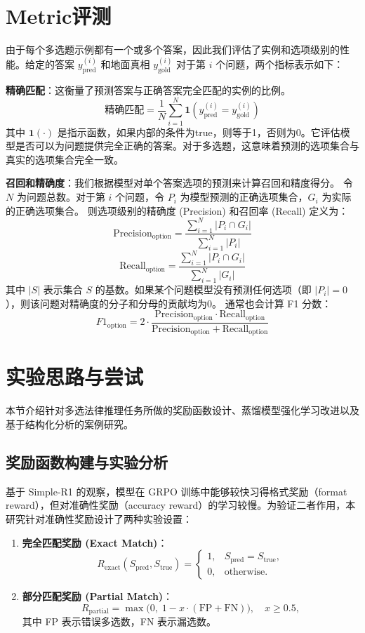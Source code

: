 \documentclass{pkuthesis}
\begin{document}
\section{Metric评测}
由于每个多选题示例都有一个或多个答案，因此我们评估了实例和选项级别的性能。给定的答案 $y^{(i)}_{\text{pred}}$ 和地面真相 $y^{(i)}_{\text{gold}}$ 对于第 $i$ 个问题，两个指标表示如下：

\textbf{精确匹配}：这衡量了预测答案与正确答案完全匹配的实例的比例。
$$ \text{精确匹配} = \frac{1}{N} \sum_{i=1}^{N} \mathbf{1}(y^{(i)}_{\text{pred}} = y^{(i)}_{\text{gold}}) $$
其中 $\mathbf{1}(\cdot)$ 是指示函数，如果内部的条件为true，则等于1，否则为0。它评估模型是否可以为问题提供完全正确的答案。对于多选题，这意味着预测的选项集合与真实的选项集合完全一致。

\textbf{召回和精确度}：我们根据模型对单个答案选项的预测来计算召回和精度得分。
令 $N$ 为问题总数。对于第 $i$ 个问题，令 $P_i$ 为模型预测的正确选项集合，$G_i$ 为实际的正确选项集合。
则选项级别的精确度 (Precision) 和召回率 (Recall) 定义为：
$$ \text{Precision}_{\text{option}} = \frac{\sum_{i=1}^N |P_i \cap G_i|}{\sum_{i=1}^N |P_i|} $$
$$ \text{Recall}_{\text{option}} = \frac{\sum_{i=1}^N |P_i \cap G_i|}{\sum_{i=1}^N |G_i|} $$
其中 $|S|$ 表示集合 $S$ 的基数。如果某个问题模型没有预测任何选项（即 $|P_i|=0$），则该问题对精确度的分子和分母的贡献均为0。
通常也会计算 F1 分数：
$$ F1_{\text{option}} = 2 \cdot \frac{\text{Precision}_{\text{option}} \cdot \text{Recall}_{\text{option}}}{\text{Precision}_{\text{option}} + \text{Recall}_{\text{option}}} $$




\section{实验思路与尝试}

本节介绍针对多选法律推理任务所做的奖励函数设计、蒸馏模型强化学习改进以及基于结构化分析的案例研究。

\subsection{奖励函数构建与实验分析}

基于 Simple-R1 的观察，模型在 GRPO 训练中能够较快习得格式奖励（format reward），但对准确性奖励（accuracy reward）的学习较慢。为验证二者作用，本研究针对准确性奖励设计了两种实验设置：

\begin{enumerate}[label=(\arabic*)]
  \item \textbf{完全匹配奖励 (Exact Match)}：
    \[
    R_{\mathrm{exact}}(S_{\mathrm{pred}}, S_{\mathrm{true}})
      = \begin{cases}
          1, & S_{\mathrm{pred}} = S_{\mathrm{true}},\\
          0, & \text{otherwise}.
        \end{cases}
    \]
  \item \textbf{部分匹配奖励 (Partial Match)}：
    \[
    R_{\mathrm{partial}}
      = \max\bigl(0,\;1 - x \cdot (\mathrm{FP} + \mathrm{FN})\bigr),\quad x \ge 0.5,
    \]
    其中 FP 表示错误多选数，FN 表示漏选数。
\end{enumerate}
\end{document}
